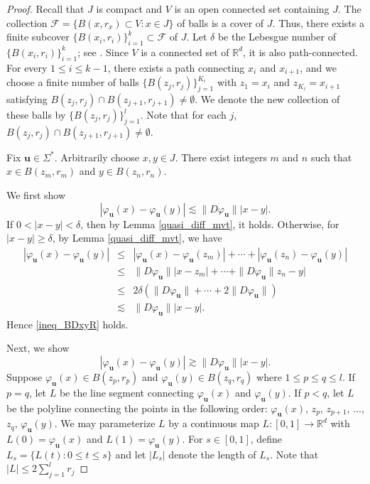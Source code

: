 \documentclass[12pt]{amsart}
\theoremstyle{plain}
\theoremstyle{definition}
\theoremstyle{remark}
\newcommand{\bu}{\mathbf{u}}
\begin{document}
\begin{proof}
Recall that $J$ is compact and $V$ is an open connected set containing $J$. The collection $\mathcal{F}=\{B(x, r_x)\subset V:x\in J\}$   of  balls is a cover of  $J$. Thus, there exists  a finite subcover $\{B(x_i, r_i)\}_{i=1}^k\subset\mathcal{F}$ of $J$. Let $\delta$ be the Lebesgue number of $\{B(x_i, r_i)\}_{i=1}^k$;  see \cite{PW}. Since $V$ is a connected set of $  \mathbb{R}^d$, it is also path-connected. For every $1\le i\le k-1$, there exists a path connecting $x_i$ and $x_{i+1}$, and we choose a finite number of balls $\{B(z_j, r_j)\}_{j=1}^{K_i}$ with  $z_1=x_i$ and $z_{K_i}=x_{i+1}$ satisfying  $B(z_j, r_j)\cap B(z_{j+1}, r_{j+1})\not=\emptyset$. We denote the new collection of these balls by $\{B(z_j, r_j)\}_{j=1}^l$.  Note that for each $j $, $B(z_j, r_j)\cap B(z_{j+1}, r_{j+1})\not=\emptyset$.  

Fix $\bu\in\Sigma^*$. Arbitrarily choose  $x, y\in J$. There exist integers $m$ and  $n$ such that $x\in B(z_m, r_m)$ and $y\in B(z_n, r_n)$.

We first  show  
\begin{equation}\label{ineq_BDxyR}
|\varphi_\mathbf{u}(x)-\varphi_\mathbf{u}(y)|\lesssim \|D\varphi_\mathbf{u}\||x-y|.
\end{equation}
If $0<|x-y|<\delta$,  then by Lemma \ref{quasi_diff_mvt}, it holds.  
Otherwise, for  $|x-y|\geq \delta$,  by Lemma \ref{quasi_diff_mvt}, we have
\begin{eqnarray*}
|\varphi_\mathbf{u}(x)-\varphi_\mathbf{u}(y)|&\le&|\varphi_\mathbf{u}(x)-\varphi_\mathbf{u}(z_m)|+\cdots+|\varphi_\mathbf{u}(z_n)-\varphi_\mathbf{u}(y)|   \\
&\le&\|D\varphi_\mathbf{u}\||x-z_m|+\cdots+\|D\varphi_\mathbf{u}\|z_n-y|  \\
&\le& 2\delta(\|D\varphi_\mathbf{u}\|+\cdots+2\|D\varphi_\mathbf{u}\|) \\
&\lesssim&\|D\varphi_\mathbf{u}\||x-y|.
\end{eqnarray*}
Hence  \eqref{ineq_BDxyR} holds.

Next, we show  \begin{equation}\label{ineq_BDxyL}
|\varphi_\mathbf{u}(x)-\varphi_\mathbf{u}(y)|\gtrsim \|D\varphi_\mathbf{u}\||x-y|.
\end{equation} 
Suppose $\varphi_\bu(x)\in B(z_p, r_p)$ and $\varphi_\bu(y)\in B(z_q, r_q)$ where $1\le p\le q\le l$. 
If $p = q$, let $L$ be the line segment connecting $\varphi_\bu(x)$ and $\varphi_\bu(y)$. If $p < q$, let $L$ be the polyline connecting the points in the following order:
$\varphi_\bu(x)$, $z_p$, $z_{p+1}$, $\dots$, $z_q$, $\varphi_\bu(y)$. We may parameterize $L$ by a continuous map $L:[0,1]\to\mathbb{R}^d$ with $L(0)=\varphi_\bu(x)$ 
and $L(1)=\varphi_\bu(y)$. For $s\in[0,1]$, define $L_s = \{L(t):0\le t\le s\}$ and let 
$|L_s|$ denote the length of $L_s$.  Note that $|L|\leq 2\sum_{j=1}^lr_j$


\end{proof}
\end{document}
